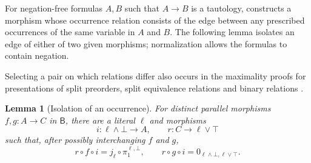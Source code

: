 \documentclass[11pt]{article}
\newtheorem{lemma}[theorem]{Lemma}
\newcommand{\B}{\mathsf B}
\begin{document}
For negation-free formulas $A,B$ such that $A\to B$ is a
tautology, \cite[Lemma~6]{DPIsomorphic} constructs a morphism whose
occurrence relation consists of the edge between any prescribed
occurrences of the same variable in $A$ and $B$. The following
lemma isolates an edge of either of two given morphisms; normalization
allows the formulas to contain negation.

Selecting a pair on which relations differ also occurs in the
maximality proofs for presentations of split preorders, split
equivalence relations and binary relations \cite[\S16]{DPSplit}.

\begin{lemma}[Isolation of an occurrence]\label{lem:isolation}
For distinct parallel morphisms $f,g:A\to C$ in $\B$, there are a
literal $\ell$ and morphisms
\[
 i:\ell\wedge\bot\longrightarrow A,
 \qquad r:C\longrightarrow\ell\vee\top
\]
such that, after possibly interchanging $f$ and $g$,
\[
 r\circ f\circ i=j_\ell\circ\pi_1^{\ell,\bot},
 \qquad
 r\circ g\circ i=0_{\ell\wedge\bot,\ell\vee\top}.
\]
\end{lemma}
\end{document}
